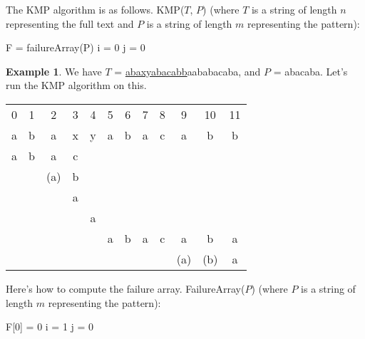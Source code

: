 \documentclass[]{article}
\theoremstyle{definition}
\newtheorem{ex}{Example}[section]
\newcommand{\lecture}[1]{\marginpar{{\footnotesize $\leftarrow$ \underline{#1}}}}
\begin{document}
				The KMP algorithm is as follows. KMP($T$, $P$) (where $T$ is a string of length $n$ representing the full text and $P$ is a string of length $m$ representing the pattern): \\
				\begin{algorithm}[H]
					F = failureArray(P)\;
					i = 0\;
					j = 0\;
				\end{algorithm}

				\begin{ex} \lecture{March 21, 2013}
					We have $T$ = \underline{abaxyabacabb}aababacaba, and $P$ = abacaba. Let's run the KMP algorithm on this.

					\begin{center}
						\begin{tabular}{|c|c|c|c|c|c|c|c|c|c|c|c|}
							0 & 1 & 2 & 3 & 4 & 5 & 6 & 7 & 8 & 9 & 10 & 11 \\
							a & b & a & x & y & a & b & a & c & a & b & b \\ \hline \hline
							a & b & a & c & & & & & & & & \\
							& & (a) & b & & & & & & & & \\
							& & & a & & & & & & & & \\
							& & & & a & & & & & & & \\
							& & & & & a & b & a & c & a & b & a \\
							& & & & & & & & & (a) & (b) & a \\ \hline
						\end{tabular}
					\end{center}
				\end{ex}

				Here's how to compute the failure array. FailureArray($P$) (where $P$ is a string of length $m$ representing the pattern): \\
				\begin{algorithm}[H]
					F[0] = 0\;
					i = 1\;
					j = 0\;
				\end{algorithm}
\end{document}
